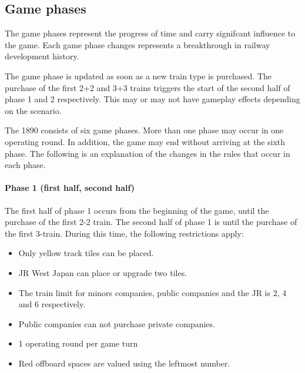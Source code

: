 \documentclass{article}
\begin{document}
\begin{CJK}{UTF8}{min}
\section{Game phases}

The game phases represent the progress of time and carry signifcant
influence to the game. Each game phase changes represents a
breakthrough in railway development history.

The game phase is updated as soon as a new train type is purchased.
The purchase of the first 2+2 and 3+3 trains triggers the start of the
second half of phase 1 and 2 respectively. This may or may not have
gameplay effects depending on the scenario.

The 1890 consists of six game phases. More than one phase may occur in
one operating round. In addition, the game may end without arriving at
the sixth phase. The following is an explanation of the changes in the
rules that occur in each phase.

\paragraph*{Phase 1 (first half, second half)}
The first half of phase 1 occurs from the beginning of the game, until
the purchase of the first 2-2 train. The second half of phase 1 is
until the purchase of the first 3-train. During this time, the
following restrictions apply:
\begin{itemize}
\item Only yellow track tiles can be placed.
\item JR West Japan can place or upgrade two tiles.
\item The train limit for minors companies, public companies and the JR is
  2, 4 and 6 respectively.
\item Public companies can not purchase private companies.
\item 1 operating round per game turn
\item Red offboard spaces are valued using the leftmost number.
\end{itemize}


\end{CJK}
\end{document}
